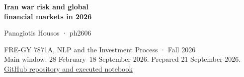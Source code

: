 \documentclass[11pt,letterpaper]{article}
\begin{document}
\thispagestyle{empty}
{\color{navy}\LARGE\sffamily\bfseries Iran war risk and global\\financial markets in 2026\par}
\vspace{5pt}
{\large Panagiotis Housos · ph2606\par}
FRE-GY 7871A, NLP and the Investment Process · Fall 2026\\
Main window: 28 February–18 September 2026. Prepared 21 September 2026.\\
\href{https://github.com/ph2606/FRE-GY-7871A-Assignment3}{GitHub repository and executed notebook}

\end{document}
